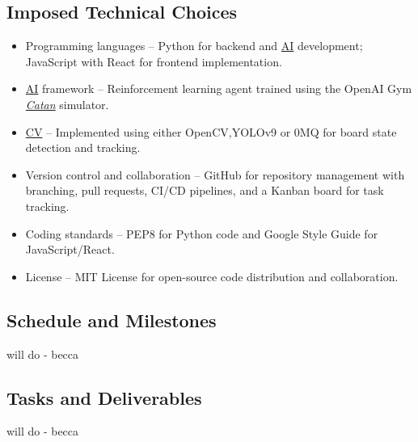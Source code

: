 \documentclass{article}
\newcommand{\Catan}{\href{https://en.wikipedia.org/wiki/Catan}{Catan}}
\newcommand{\AI}{\href{https://en.wikipedia.org/wiki/Artificial_intelligence}{AI}}
\newcommand{\CV}{\href{https://www.ibm.com/think/topics/computer-vision}{CV}}
\begin{document}
\subsection{Imposed Technical Choices}\label{subsec:technicalchoices}
\begin{itemize}
    \item {Programming languages} – Python for backend and \AI{} development; JavaScript with React for frontend implementation.
    \item {\AI{} framework} – Reinforcement learning agent trained using the OpenAI Gym \emph{\Catan{}} simulator.
    \item {\CV{}} – Implemented using either OpenCV,YOLOv9 or 0MQ for board state detection and tracking.
    \item {Version control and collaboration} – GitHub for repository management with branching, pull requests, CI/CD pipelines, and a Kanban board for task tracking.
    \item {Coding standards} – PEP8 for Python code and Google Style Guide for JavaScript/React.
    \item {License} – MIT License for open-source code distribution and collaboration.
\end{itemize}

\subsection{Schedule and Milestones}\label{subsec:schedule}
\raggedright will do - becca

\subsection{Tasks and Deliverables}\label{subsec:tasks}
\raggedright will do - becca
\end{document}
